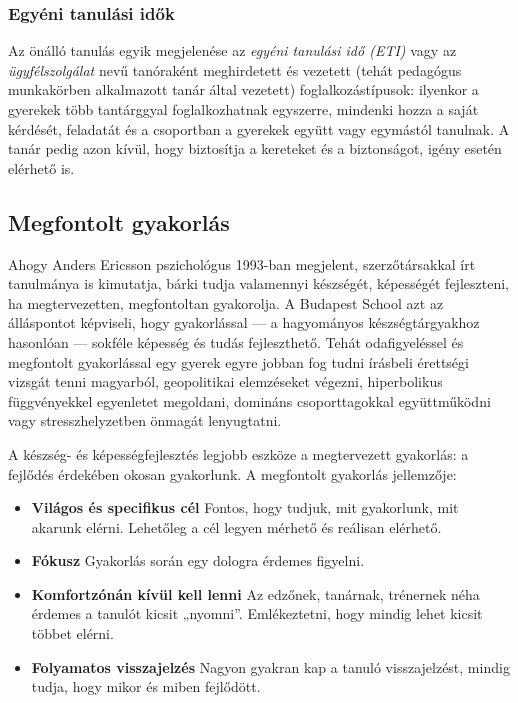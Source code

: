 \hypertarget{egyeni-tanulasi-idok}{%
\subsubsection{Egyéni tanulási idők}\label{egyeni-tanulasi-idok}}

Az önálló tanulás egyik megjelenése az \emph{egyéni tanulási idő (ETI)}
vagy az \emph{ügyfélszolgálat} nevű tanóraként meghirdetett és vezetett
(tehát pedagógus munkakörben alkalmazott tanár által vezetett)
foglalkozástípusok: ilyenkor a gyerekek több tantárggyal
foglalkozhatnak egyszerre, mindenki hozza a saját kérdését, feladatát és
a csoportban a gyerekek együtt vagy egymástól tanulnak. A tanár pedig
azon kívül, hogy biztosítja a kereteket és a biztonságot, igény esetén
elérhető is.

\hypertarget{megfontolt-gyakorlas}{%
\subsection{Megfontolt gyakorlás}\label{megfontolt-gyakorlas}}

Ahogy Anders Ericsson pszichológus
1993-ban
megjelent, szerzőtársakkal írt tanulmánya {\autocite{ericsson:etal:1993}} is kimutatja, bárki tudja valamennyi készségét,
képességét fejleszteni, ha megtervezetten, megfontoltan gyakorolja. A
Budapest School azt az álláspontot képviseli, hogy gyakorlással --- a
hagyományos készségtárgyakhoz hasonlóan --- sokféle képesség és tudás
fejleszthető. Tehát odafigyeléssel és megfontolt gyakorlással egy gyerek
egyre jobban fog tudni írásbeli érettségi vizsgát tenni magyarból,
geopolitikai elemzéseket végezni, hiperbolikus függvényekkel egyenletet
megoldani, domináns csoporttagokkal együttműködni vagy
stresszhelyzetben
önmagát lenyugtatni.

A készség- és képességfejlesztés legjobb eszköze a megtervezett
gyakorlás: a fejlődés érdekében okosan gyakorlunk. A megfontolt
gyakorlás jellemzője:

\begin{itemize}
\tightlist
\item
  \textbf{Világos és specifikus cél} Fontos, hogy tudjuk, mit
  gyakorlunk, mit akarunk elérni. Lehetőleg a cél legyen mérhető és
  reálisan elérhető.
\item
  \textbf{Fókusz} Gyakorlás során egy dologra érdemes figyelni.
\item
  \textbf{Komfortzónán kívül kell lenni} Az edzőnek, tanárnak, trénernek
  néha érdemes a tanulót kicsit „nyomni''. Emlékeztetni, hogy mindig
  lehet kicsit többet elérni.
\item
  \textbf{Folyamatos visszajelzés} Nagyon gyakran kap a tanuló
  visszajelzést, mindig tudja, hogy mikor és miben fejlődött.
\end{itemize}
